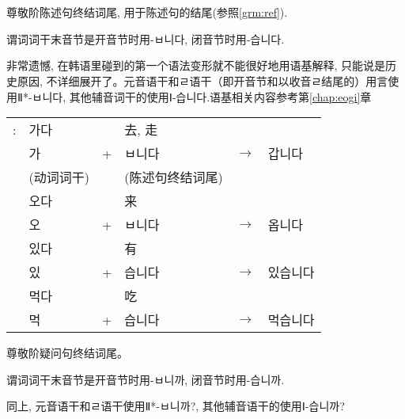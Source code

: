 \section{\kr{}}
\begin{grammar}
	\begin{grammarsect}
		\begin{itemize}
			\item 尊敬阶陈述句终结词尾, 用于陈述句的结尾(参照\ref{grm:ref}).
			\item 谓词词干末音节是开音节时用{\kr -ㅂ니다}, 闭音节时用{\kr -습니다.}
			      {\color{gray} \item 非常遗憾, 在韩语里碰到的第一个语法变形就不能很好地用语基解释, 只能说是历史原因, 不详细展开了。元音语干和ㄹ语干（即开音节和以收音ㄹ结尾的）用言使用Ⅱ*{\kr -ㅂ니다}, 其他辅音词干的使用Ⅰ{\kr -습니다.}语基相关内容参考第\ref{chap:eogi}章}
		\end{itemize}
		\begin{tabular}{llllll}
			\kr \ruby{例}{예}: & \kr 가다 &   & 去, 走                         \\
                            & \kr 가  & + & \kr ㅂ니다   & $\to$ & \kr 갑니다  \\
                            & (动词词干) &   & (陈述句终结词尾)                    \\
                            & \kr 오다 &   & 来                            \\
                            & \kr 오  & + & \kr ㅂ니다   & $\to$ & \kr 옵니다  \\
                            & \kr 있다 &   & 有                            \\
                            & \kr 있  & + & \kr 습니다   & $\to$ & \kr 있습니다 \\
                            & \kr 먹다 &   & 吃                            \\
                            & \kr 먹  & + & \kr 습니다   & $\to$ & \kr 먹습니다 \\
		\end{tabular}
	\end{grammarsect}
	\begin{grammarsect}
		\begin{itemize}
			\item 尊敬阶疑问句终结词尾。
			\item 谓词词干末音节是开音节时用-ㅂ니까, 闭音节时用-습니까.
			      {\color{gray} \item 同上, 元音语干和ㄹ语干使用Ⅱ*{\kr -ㅂ니까?}, 其他辅音语干的使用Ⅰ{\kr -습니까?}}

\end{itemize}
\end{grammarsect}
\end{grammar}

